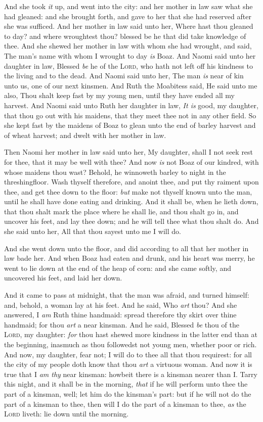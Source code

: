 \documentclass[11pt,letterpaper,oneside]{memoir}
\begin{document}
And she took \emph{it} up, and went into the city: and her mother in law 
saw what she had gleaned: and she brought forth, and gave to her that 
she had reserved after she was sufficed. And her mother in law said unto 
her, Where hast thou gleaned to day? and where wroughtest thou? blessed 
be he that did take knowledge of thee. And she shewed her mother in law 
with whom she had wrought, and said, The man's name with whom I wrought 
to day \emph{is} Boaz. And Naomi said unto her daughter in law, Blessed 
\emph{be} he of the \textsc{Lord}, who hath not left off his kindness to 
the living and to the dead. And Naomi said unto her, The man \emph{is} 
near of kin unto us, one of our next kinsmen. And Ruth the Moabitess 
said, He said unto me also, Thou shalt keep fast by my young men, until 
they have ended all my harvest. And Naomi said unto Ruth her daughter in 
law, \emph{It is} good, my daughter, that thou go out with his maidens, 
that they meet thee not in any other field. So she kept fast by the 
maidens of Boaz to glean unto the end of barley harvest and of wheat 
harvest; and dwelt with her mother in law. 

Then Naomi her mother in law said unto her, My daughter, shall I not 
seek rest for thee, that it may be well with thee? And now \emph{is} not 
Boaz of our kindred, with whose maidens thou wast? Behold, he winnoweth 
barley to night in the threshingfloor. Wash thyself therefore, and 
anoint thee, and put thy raiment upon thee, and get thee down to the 
floor: \emph{but} make not thyself known unto the man, until he shall 
have done eating and drinking. And it shall be, when he lieth down, that 
thou shalt mark the place where he shall lie, and thou shalt go in, and 
uncover his feet, and lay thee down; and he will tell thee what thou 
shalt do. And she said unto her, All that thou sayest unto me I will do. 

And she went down unto the floor, and did according to all that her 
mother in law bade her. And when Boaz had eaten and drunk, and his heart 
was merry, he went to lie down at the end of the heap of corn: and she 
came softly, and uncovered his feet, and laid her down. 

And it came to pass at midnight, that the man was afraid, and turned 
himself: and, behold, a woman lay at his feet. And he said, Who 
\emph{art} thou? And she answered, I \emph{am} Ruth thine handmaid: 
spread therefore thy skirt over thine handmaid; for thou \emph{art} a 
near kinsman. And he said, Blessed \emph{be} thou of the \textsc{Lord}, 
my daughter: \emph{for} thou hast shewed more kindness in the latter end 
than at the beginning, inasmuch as thou followedst not young men, 
whether poor or rich. And now, my daughter, fear not; I will do to thee 
all that thou requirest: for all the city of my people doth know that 
thou \emph{art} a virtuous woman. And now it is true that I \emph{am 
thy} near kinsman: howbeit there is a kinsman nearer than I. Tarry this 
night, and it shall be in the morning, \emph{that} if he will perform 
unto thee the part of a kinsman, well; let him do the kinsman's part: 
but if he will not do the part of a kinsman to thee, then will I do the 
part of a kinsman to thee, \emph{as} the \textsc{Lord} liveth: lie down 
until the morning. 
\end{document}
